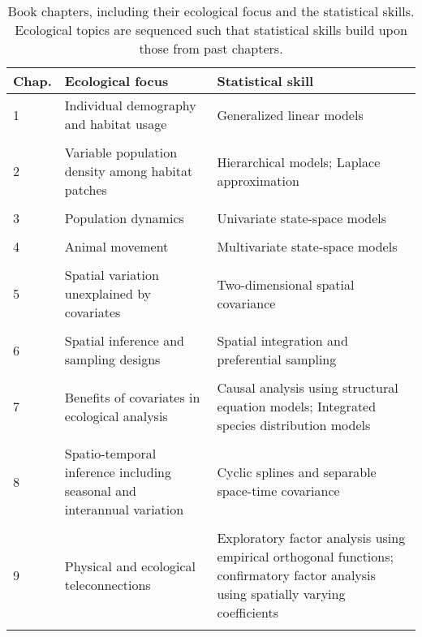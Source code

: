 \begin{table}
  \caption[Organization of chapters]{Book chapters, including their ecological focus and the statistical skills. Ecological topics are sequenced such that statistical skills build upon those from past chapters.}
\begin{center}
\begin{tabularx}{\textwidth}{ | X m{2.25in} m{2.5in} | } 
  \hline
  Chap. & Ecological focus & Statistical skill\\ 
  \hline
  1 & Individual demography and habitat usage & Generalized linear models \\ & & \\ 
  
  2 & Variable population density among habitat patches & Hierarchical models; Laplace approximation \\ & & \\ 
  
  3 & Population dynamics & Univariate state-space models \\ & & \\ 
  
  4 & Animal movement & Multivariate state-space models \\ & & \\
  
  5 & Spatial variation unexplained by covariates & Two-dimensional spatial covariance \\ & & \\
  
  6 & Spatial inference and sampling designs & Spatial integration and preferential sampling \\ & & \\
  
  7 & Benefits of covariates in ecological analysis & Causal analysis using structural equation models; Integrated species distribution models \\ & & \\
  
  8 & Spatio-temporal inference including seasonal and interannual variation & Cyclic splines and separable space-time covariance \\ & & \\
  
  9 & Physical and ecological teleconnections & Exploratory factor analysis using empirical orthogonal functions; confirmatory factor analysis using spatially varying coefficients \\ & & \\
  

\end{tabularx}
\end{center}
\end{table}
